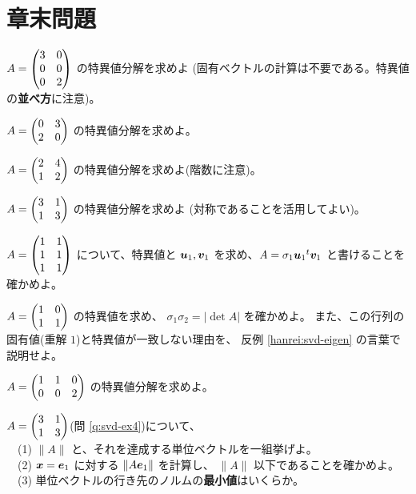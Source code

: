 \section*{章末問題}

\begin{mondai}[基本]\label{q:svd-ex1}
$A = \begin{pmatrix}3 & 0 \\ 0 & 0 \\ 0 & 2\end{pmatrix}$ の特異値分解を求めよ
(固有ベクトルの計算は不要である。特異値の\textbf{並べ方}に注意)。
\end{mondai}

\begin{mondai}[基本]\label{q:svd-ex2}
$A = \begin{pmatrix}0 & 3 \\ 2 & 0\end{pmatrix}$ の特異値分解を求めよ。
\end{mondai}

\begin{mondai}[基本]\label{q:svd-ex3}
$A = \begin{pmatrix}2 & 4 \\ 1 & 2\end{pmatrix}$ の特異値分解を求めよ(階数に注意)。
\end{mondai}

\begin{mondai}[基本]\label{q:svd-ex4}
$A = \begin{pmatrix}3 & 1 \\ 1 & 3\end{pmatrix}$ の特異値分解を求めよ
(対称であることを活用してよい)。
\end{mondai}

\begin{mondai}[標準]\label{q:svd-ex5}
$A = \begin{pmatrix}1 & 1 \\ 1 & 1 \\ 1 & 1\end{pmatrix}$ について、特異値と
$\bm{u}_1, \bm{v}_1$ を求め、$A = \sigma_1\bm{u}_1{}^t\bm{v}_1$
と書けることを確かめよ。
\end{mondai}

\begin{mondai}[標準]\label{q:svd-ex6}
$A = \begin{pmatrix}1 & 0 \\ 1 & 1\end{pmatrix}$ の特異値を求め、
$\sigma_1\sigma_2 = |\det A|$ を確かめよ。
また、この行列の固有値(重解 $1$)と特異値が一致しない理由を、
反例 \ref{hanrei:svd-eigen} の言葉で説明せよ。
\end{mondai}

\begin{mondai}[標準]\label{q:svd-ex7}
$A = \begin{pmatrix}1 & 1 & 0 \\ 0 & 0 & 2\end{pmatrix}$ の特異値分解を求めよ。
\end{mondai}

\begin{mondai}[標準]\label{q:svd-ex8}
$A = \begin{pmatrix}3 & 1 \\ 1 & 3\end{pmatrix}$(問 \ref{q:svd-ex4})について、\\
　(1) $\|A\|$ と、それを達成する単位ベクトルを一組挙げよ。\\
　(2) $\bm{x} = \bm{e}_1$ に対する $\|A\bm{e}_1\|$ を計算し、
$\|A\|$ 以下であることを確かめよ。\\
　(3) 単位ベクトルの行き先のノルムの\textbf{最小値}はいくらか。
\end{mondai}

